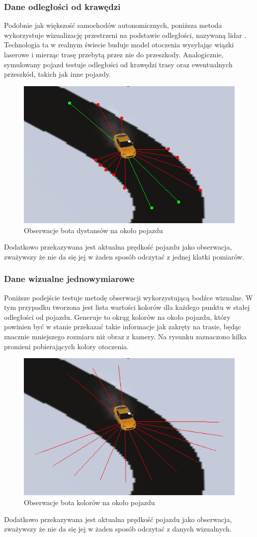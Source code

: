 \subsubsection{Dane odległości od krawędzi}
Podobnie jak większość samochodów autonomicznych, poniższa metoda wykorzystuje wizualizację przestrzeni na podstawie odległości, nazywaną lidar \cite{Lidar}. Technologia ta w realnym świecie buduje model otoczenia wysyłając wiązki laserowe i mierząc trasę przebytą przez nie do przeszkody. Analogicznie, symulowany pojazd testuje odległości od krawędzi trasy oraz ewentualnych przeszkód, takich jak inne pojazdy.
\begin{figure}[H]
    \centering
    \includegraphics[width=.5\textwidth]{figures/observations_0}
    \caption{Obserwacje bota dystansów na około pojazdu}
    \label{fig}
\end{figure}
Dodatkowo przekazywana jest aktualna prędkość pojazdu jako obserwacja, zważywszy że nie da się jej w żaden sposób odczytać z jednej klatki pomiarów.

\subsubsection{Dane wizualne jednowymiarowe}
Poniższe podejście testuje metodę obserwacji wykorzystującą bodźce wizualne. W tym przypadku tworzona jest lista wartości kolorów dla każdego punktu w stałej odległości od pojazdu. Generuje to okrąg kolorów na około pojazdu, który powinien być w stanie przekazać takie informacje jak zakręty na trasie, będąc znacznie mniejszego rozmiaru niż obraz z kamery. Na rysunku zaznaczono kilka promieni pobierających kolory otoczenia.
\begin{figure}[H]
    \centering
    \includegraphics[width=.5\textwidth]{figures/observations_1}
    \caption{Obserwacje bota kolorów na około pojazdu}
    \label{fig}
\end{figure}
Dodatkowo przekazywana jest aktualna prędkość pojazdu jako obserwacja, zważywszy że nie da się jej w żaden sposób odczytać z danych wizualnych.

